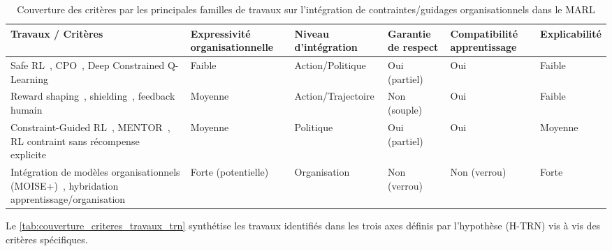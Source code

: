\begin{table}[h!]
  \centering
  \caption{Couverture des critères par les principales familles de travaux sur l’intégration de contraintes/guidages organisationnels dans le MARL}
  \label{tab:couverture_criteres_travaux_trn}
  \scriptsize
  \begin{tabular}{|p{4cm}|p{1.4cm}|p{2cm}|p{1.4cm}|p{1.4cm}|p{1.4cm}|}
    \hline
    \textbf{Travaux / Critères}                                                                                                                              & \textbf{Expressivité organisationnelle} & \textbf{Niveau d’intégration} & \textbf{Garantie de respect} & \textbf{Compatibilité apprentissage} & \textbf{Explicabilité} \\
    \hline
    Safe RL~\cite{garcia2015comprehensive}, CPO~\cite{achiam2017constrained}, Deep Constrained Q-Learning~\cite{kalweit2020deep}                             & Faible                                  & Action/Politique              & Oui (partiel)                & Oui                                  & Faible                 \\
    \hline
    Reward shaping~\cite{ng1999policy}, shielding~\cite{amodei2016concrete}, feedback humain~\cite{warnell2018deep,zhou2025mentor}                           & Moyenne                                 & Action/Trajectoire            & Non (souple)                 & Oui                                  & Faible                 \\
    \hline
    Constraint-Guided RL~\cite{spieker2021constraint}, MENTOR~\cite{zhou2025mentor}, RL contraint sans récompense explicite~\cite{miryoosefi2022}            & Moyenne                                 & Politique                     & Oui (partiel)                & Oui                                  & Moyenne                \\
    \hline
    Intégration de modèles organisationnels (MOISE+)~\cite{hubner2007using}, hybridation apprentissage/organisation~\cite{bordini2006jade,chernova2014robot} & Forte (potentielle)                     & Organisation                  & Non (verrou)                 & Non (verrou)                         & Forte                  \\
    \hline
  \end{tabular}
\end{table}

Le \autoref{tab:couverture_criteres_travaux_trn} synthétise les travaux identifiés dans les trois axes définis par l’hypothèse (H-TRN) vis à vis des critères spécifiques.


